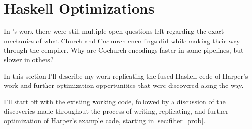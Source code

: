 
\section{Haskell Optimizations}\label{sec:haskell}
In \cite{Harper2011}'s work there were still multiple open questions left regarding the exact mechanics of what Church and Cochurch encodings did while making their way through the compiler. Why are Cochurch encodings faster in some pipelines, but slower in others?

In this section I'll describe my work replicating the fused Haskell code of Harper's work and further optimization opportunities that were discovered along the way.

I'll start off with the existing working code, followed by a discussion of the discoveries made throughout the process of writing, replicating, and further optimization of Harper's example code, starting in \autoref{sec:filter_prob}.

